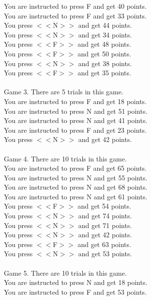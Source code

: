 \documentclass[pdflatex,sn-nature]{sn-jnl}%
\theoremstyle{thmstyleone}%
\theoremstyle{thmstyletwo}%
\theoremstyle{thmstylethree}%
\begin{document}
You are instructed to press F and get 40 points. $~$\\ 
You are instructed to press F and get 33 points. $~$\\ 
You press $<<$N$>>$ and get 44 points. $~$\\ 
You press $<<$N$>>$ and get 34 points. $~$\\ 
You press $<<$F$>>$ and get 48 points. $~$\\ 
You press $<<$F$>>$ and get 50 points. $~$\\ 
You press $<<$N$>>$ and get 38 points. $~$\\ 
You press $<<$F$>>$ and get 35 points. $~$\\ 
 $~$\\ 
Game 3. There are 5 trials in this game. $~$\\ 
You are instructed to press F and get 18 points. $~$\\ 
You are instructed to press N and get 51 points. $~$\\ 
You are instructed to press N and get 41 points. $~$\\ 
You are instructed to press F and get 23 points. $~$\\ 
You press $<<$N$>>$ and get 42 points. $~$\\ 
 $~$\\ 
Game 4. There are 10 trials in this game. $~$\\ 
You are instructed to press F and get 65 points. $~$\\ 
You are instructed to press N and get 55 points. $~$\\ 
You are instructed to press N and get 68 points. $~$\\ 
You are instructed to press N and get 61 points. $~$\\ 
You press $<<$F$>>$ and get 54 points. $~$\\ 
You press $<<$N$>>$ and get 74 points. $~$\\ 
You press $<<$N$>>$ and get 71 points. $~$\\ 
You press $<<$N$>>$ and get 42 points. $~$\\ 
You press $<<$F$>>$ and get 63 points. $~$\\ 
You press $<<$N$>>$ and get 53 points. $~$\\ 
 $~$\\ 
Game 5. There are 10 trials in this game. $~$\\ 
You are instructed to press N and get 18 points. $~$\\ 
You are instructed to press F and get 53 points. $~$\\ 
\end{document}
